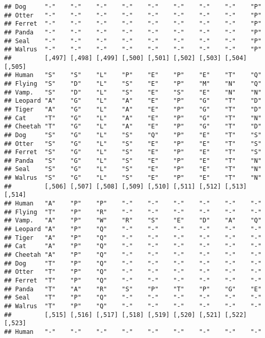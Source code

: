 \documentclass[]{article}
\begin{document}
\begin{verbatim}
## Dog     "-"    "-"    "-"    "-"    "-"    "-"    "-"    "-"    "P"   
## Otter   "-"    "-"    "-"    "-"    "-"    "-"    "-"    "-"    "P"   
## Ferret  "-"    "-"    "-"    "-"    "-"    "-"    "-"    "-"    "P"   
## Panda   "-"    "-"    "-"    "-"    "-"    "-"    "-"    "-"    "P"   
## Seal    "-"    "-"    "-"    "-"    "-"    "-"    "-"    "-"    "P"   
## Walrus  "-"    "-"    "-"    "-"    "-"    "-"    "-"    "-"    "P"   
##         [,497] [,498] [,499] [,500] [,501] [,502] [,503] [,504] [,505]
## Human   "S"    "S"    "L"    "P"    "E"    "P"    "E"    "T"    "Q"   
## Flying  "S"    "D"    "L"    "S"    "E"    "P"    "M"    "N"    "Q"   
## Vamp.   "S"    "D"    "L"    "S"    "E"    "S"    "E"    "N"    "N"   
## Leopard "A"    "G"    "L"    "A"    "E"    "P"    "G"    "T"    "D"   
## Tiger   "A"    "G"    "L"    "A"    "E"    "P"    "G"    "T"    "D"   
## Cat     "T"    "G"    "L"    "A"    "E"    "P"    "G"    "T"    "N"   
## Cheetah "T"    "G"    "L"    "A"    "E"    "P"    "G"    "T"    "D"   
## Dog     "S"    "G"    "L"    "S"    "Q"    "P"    "E"    "T"    "S"   
## Otter   "S"    "G"    "L"    "S"    "E"    "P"    "E"    "T"    "S"   
## Ferret  "S"    "G"    "L"    "S"    "E"    "P"    "E"    "T"    "S"   
## Panda   "S"    "G"    "L"    "S"    "E"    "P"    "E"    "T"    "N"   
## Seal    "S"    "G"    "L"    "S"    "E"    "P"    "E"    "T"    "N"   
## Walrus  "S"    "G"    "L"    "S"    "E"    "P"    "E"    "T"    "N"   
##         [,506] [,507] [,508] [,509] [,510] [,511] [,512] [,513] [,514]
## Human   "A"    "P"    "P"    "-"    "-"    "-"    "-"    "-"    "-"   
## Flying  "T"    "P"    "R"    "-"    "-"    "-"    "-"    "-"    "-"   
## Vamp.   "A"    "P"    "W"    "R"    "S"    "E"    "D"    "A"    "Q"   
## Leopard "A"    "P"    "Q"    "-"    "-"    "-"    "-"    "-"    "-"   
## Tiger   "A"    "P"    "Q"    "-"    "-"    "-"    "-"    "-"    "-"   
## Cat     "A"    "P"    "Q"    "-"    "-"    "-"    "-"    "-"    "-"   
## Cheetah "A"    "P"    "Q"    "-"    "-"    "-"    "-"    "-"    "-"   
## Dog     "T"    "P"    "Q"    "-"    "-"    "-"    "-"    "-"    "-"   
## Otter   "T"    "P"    "Q"    "-"    "-"    "-"    "-"    "-"    "-"   
## Ferret  "T"    "P"    "Q"    "-"    "-"    "-"    "-"    "-"    "-"   
## Panda   "T"    "A"    "R"    "S"    "P"    "T"    "P"    "G"    "E"   
## Seal    "T"    "P"    "Q"    "-"    "-"    "-"    "-"    "-"    "-"   
## Walrus  "T"    "P"    "Q"    "-"    "-"    "-"    "-"    "-"    "-"   
##         [,515] [,516] [,517] [,518] [,519] [,520] [,521] [,522] [,523]
## Human   "-"    "-"    "-"    "-"    "-"    "-"    "-"    "-"    "-"   

\end{verbatim}
\end{document}
